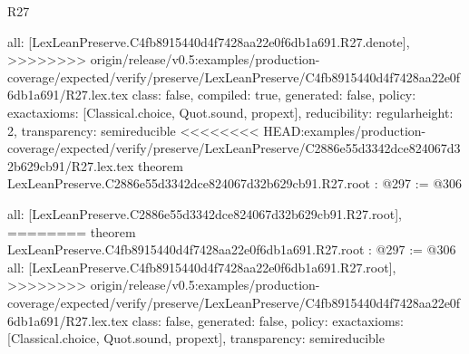 \begin{lexlean}{R27}
\begin{coremodule}
{{{{{  all: [LexLeanPreserve.C4fb8915440d4f7428aa22e0f6db1a691.R27.denote],
>>>>>>>> origin/release/v0.5:examples/production-coverage/expected/verify/preserve/LexLeanPreserve/C4fb8915440d4f7428aa22e0f6db1a691/R27.lex.tex
  class: false,
  compiled: true,
  generated: false,
  policy: exact{axioms: [Classical.choice, Quot.sound, propext]},
  reducibility: regular{height: 2},
  transparency: semireducible
}
<<<<<<<< HEAD:examples/production-coverage/expected/verify/preserve/LexLeanPreserve/C2886e55d3342dce824067d32b629cb91/R27.lex.tex
theorem LexLeanPreserve.C2886e55d3342dce824067d32b629cb91.R27.root : @297 := @306 {
  all: [LexLeanPreserve.C2886e55d3342dce824067d32b629cb91.R27.root],
========
theorem LexLeanPreserve.C4fb8915440d4f7428aa22e0f6db1a691.R27.root : @297 := @306 {
  all: [LexLeanPreserve.C4fb8915440d4f7428aa22e0f6db1a691.R27.root],
>>>>>>>> origin/release/v0.5:examples/production-coverage/expected/verify/preserve/LexLeanPreserve/C4fb8915440d4f7428aa22e0f6db1a691/R27.lex.tex
  class: false,
  generated: false,
  policy: exact{axioms: [Classical.choice, Quot.sound, propext]},
  transparency: semireducible
}

}}}}}
\end{coremodule}
\end{lexlean}
